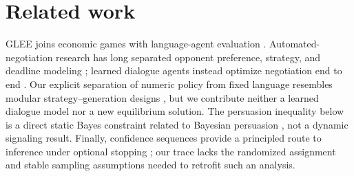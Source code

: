 \section{Related work}

GLEE joins economic games with language-agent evaluation
\citep{shapira2024glee}. Automated-negotiation research has long separated
opponent preference, strategy, and deadline modeling \citep{baarslag2016opponent};
learned dialogue agents instead optimize negotiation end to end
\citep{lewis2017deal}. Our explicit separation of numeric policy from fixed
language resembles modular strategy--generation designs
\citep{he2018decoupling}, but we contribute neither a learned dialogue model nor
a new equilibrium solution. The persuasion inequality below is a direct static
Bayes constraint related to Bayesian persuasion \citep{kamenica2011bayesian},
not a dynamic signaling result. Finally, confidence sequences provide a
principled route to inference under optional stopping
\citep{howard2021confidence}; our trace lacks the randomized assignment and
stable sampling assumptions needed to retrofit such an analysis.
